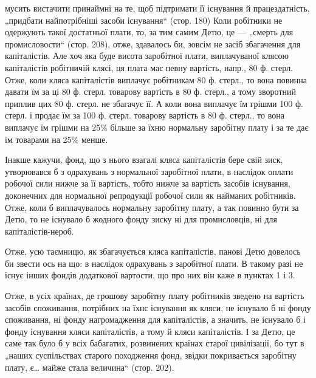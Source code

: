 \parcont{}  %
мусить вистачити принаймні на те, щоб підтримати її існування й
працездатність, „придбати найпотрібніші засоби існування“ (стор. 180)
Коли робітники не одержують такої достатньої плати, то, за тим самим
Детю, це — „смерть для промисловости“ (стор. 208), отже, здавалось би,
зовсім не засіб збагачення для капіталістів. Але хоч яка буде висота заробітної
плати, виплачуваної клясою капіталістів робітничій клясі, ця плата
має певну вартість, напр., 80 ф. стерл. Отже, коли кляса капіталістів
виплачує робітникам 80 ф. стерл., то вона повинна давати їм за ці 80 ф.
стерл. товарову вартість в 80 ф. стерл., а тому зворотний приплив цих
80 ф. стерл. не збагачує її. А коли вона виплачує їм грішми 100 ф. стерл.
і продає їм за 100 ф. стерл. товарову вартість в 80 ф. стерл., то вона
виплачує їм грішми на 25\% більше за їхню нормальну заробітну плату
і за те дає їм товарами на 25\% менше.

Інакше кажучи, фонд, що з нього взагалі кляса капіталістів бере свій
зиск, утворювався б з одрахувань з нормальної заробітної плати, в наслідок
оплати робочої сили нижче за її вартість, тобто нижче за вартість засобів
існування, доконечних для нормальної репродукції робочої сили як
найманих робітників. Отже, коли б виплачувалось нормальну заробітну
плату, а так повинно бути за Детю, то не існувало б жодного фонду
зиску ні для промисловців, ні для капіталістів-нероб.

Отже, усю таємницю, як збагачується кляса капіталістів, панові Детю
довелось би звести ось на що: в наслідок одрахувань з заробітної плати.
В такому разі не існує інших фондів додаткової вартости, що про них
він каже в пунктах 1 і 3.

Отже, в усіх країнах, де грошову заробітну плату робітників зведено
на вартість засобів споживання, потрібних на їхнє існування як кляси,
не існувало б ні фонду споживання, ні фонду нагромадження для капіталістів,
а значить, не існувало б і фонду існування кляси капіталістів, а
тому й кляси капіталістів. І за Детю, це саме так було б у всіх бабагатих,
розвинених країнах старої цивілізації, бо тут в „наших суспільствах
старого походження фонд, звідки покривається заробітну плату,
є\dots{} майже стала величина“ (стор. 202).

